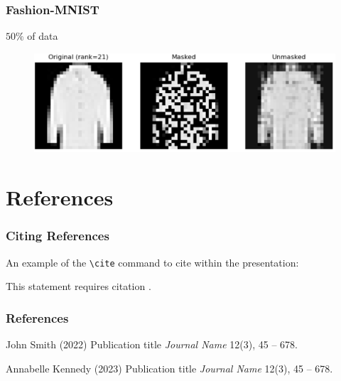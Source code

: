 \documentclass[
	11pt, %
]{beamer}
\begin{document}
\begin{frame}
	\frametitle{Fashion-MNIST}
	$50 \%$ of data
	\begin{figure}
		\centering
		\includegraphics[scale=.2]{assets/mc_ex2_orig.jpg}
	\end{figure}
\end{frame}





\section{References}

\begin{frame}
	\frametitle{Citing References}
	
	An example of the \texttt{\textbackslash cite} command to cite within the presentation:
	
	\bigskip %
	
	This statement requires citation \cite{p1,p2}.
\end{frame}


\begin{frame} %
	\frametitle{References}
	
	\begin{thebibliography}{99} %
		\footnotesize %
		
			John Smith (2022)
			\newblock Publication title
			\newblock \emph{Journal Name} 12(3), 45 -- 678.
			
			Annabelle Kennedy (2023)
			\newblock Publication title
			\newblock \emph{Journal Name} 12(3), 45 -- 678.
	\end{thebibliography}
\end{frame}
\end{document}
